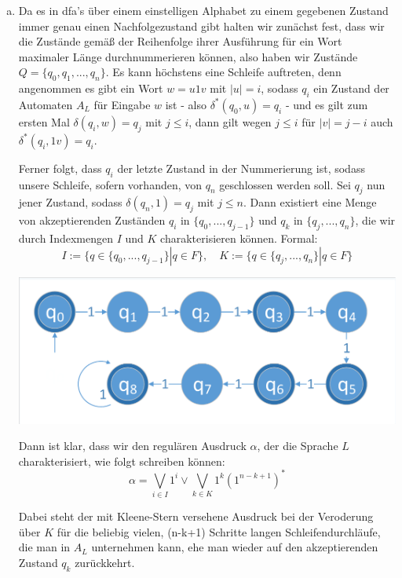 \documentclass{article}
\begin{document}
\begin{enumerate}[a)]
	\item Da es in dfa's über einem einstelligen Alphabet zu einem gegebenen Zustand immer genau einen Nachfolgezustand gibt halten wir zunächst fest, dass wir die Zustände gemäß der Reihenfolge ihrer Ausführung für ein Wort maximaler Länge durchnummerieren können, also haben wir Zustände $Q = \{q_0,q_1, ..., q_n\}$. Es kann höchstens eine Schleife auftreten, denn angenommen es gibt ein Wort $w = u1v$ mit $|u| = i$, sodass $q_i$ ein Zustand der Automaten $A_L$ für Eingabe $w$ ist - also $\delta^*(q_0,u) = q_i$ - und es gilt zum ersten Mal $\delta(q_i,w) = q_j$ mit $j \le i$, dann gilt wegen $j \le i$ für $|v| = j -i$ auch $\delta^*(q_i,1v) = q_i$.
	
	Ferner folgt, dass $q_i$ der letzte Zustand in der Nummerierung ist, sodass unsere Schleife, sofern vorhanden, von $q_n$ geschlossen werden soll. Sei $q_j$ nun jener Zustand, sodass $\delta(q_n,1) = q_j$ mit $j \le n$. Dann existiert eine Menge von akzeptierenden Zuständen $q_i$ in $\{q_0, ..., q_{j-1}\}$ und $q_k$ in $\{q_j, ..., q_n\}$, die wir durch Indexmengen $I$ und $K$ charakterisieren können. Formal:
	\begin{equation}
		I := \{q \in \{q_0,...,q_{j-1}\} | q \in F\}, \quad K := \{q \in \{q_j,...,q_n\} | q \in F\}
	\end{equation}
	
	\begin{minipage}{\textwidth}
		\centering\includegraphics[width=\textwidth,page=2,trim={2 2 2 4},clip]{dfas.pdf}
	\end{minipage}
	
	Dann ist klar, dass wir den regulären Ausdruck $\alpha$, der die Sprache $L$ charakterisiert, wie folgt schreiben können:
	\begin{equation}
		\alpha = \bigvee\limits_{i\in I} 1^i \lor \bigvee\limits_{k \in K}1^k \left(1^{n-k+1}\right)^*
	\end{equation}
	
	Dabei steht der mit Kleene-Stern versehene Ausdruck bei der Veroderung über $K$ für die beliebig vielen, (n-k+1) Schritte langen Schleifendurchläufe, die man in $A_L$ unternehmen kann, ehe man wieder auf den akzeptierenden Zustand $q_k$ zurückkehrt.
	
\end{enumerate}
\end{document}
